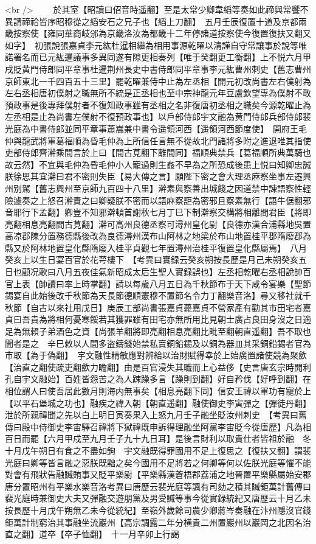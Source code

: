 <br />
　　於其室【昭讀曰佋音時遥翻】至是太常少卿韋縚等奏如此禘與常饗不異請禘祫皆序昭穆從之縚安石之兄子也【縚上刀翻】　五月壬辰復置十道及京都兩畿按察使【雍同華商岐邠為京畿洛汝為都畿十二年停諸道按察使今復置復扶又翻又如字】　初張說張嘉貞李元紘杜暹相繼為相用事源乾曜以清謹自守常讓事於說等唯諾署名而已元紘暹議事多異同遂有隙更相奏列【唯于癸翻更工衡翻】上不悦六月甲戌貶黄門侍郎同平章事杜暹荆州長史中書侍郎同平章事李元紘曹州刺史【舊志曹州京師東北一千四百五十三里】罷乾曜兼侍中止為左丞相【開元初改尚書左右僕射為左右丞相唐初僕射之職無所不統是正丞相也至中宗神龍元年豆盧欽望專為僕射不敢預政事是後專拜僕射者不復知政事雖有丞相之名非復唐初丞相之職矣今源乾曜止為左丞相是止為尚書左僕射不復預政事也】以戶部侍郎宇文融為黄門侍郎兵部侍郎裴光庭為中書侍郎並同平章事蕭嵩兼中書令遥領河西【遥領河西節度使】　開府王毛仲與龍武將軍葛福順為昏毛仲為上所信任言無不從故北門諸將多附之進退唯其指使吏部侍郎齊澣乘間言於上曰【間古莧翻下離間同】福順典禁兵【葛福順所典萬騎也故云然】不宜與毛仲為昏毛仲小人寵過則生姦不早為之所恐成後患上悦曰知卿忠誠朕徐思其宜澣曰君不密則失臣【易大傳之言】願陛下密之會大理丞麻察坐事左遷興州别駕【舊志興州至京師九百四十八里】澣素與察善出城餞之因道禁中諫語察性輕險遽奏之上怒召澣責之曰卿疑朕不密而以語麻察詎為密邪且察素無行【語牛倨翻邪音耶行下孟翻】卿豈不知邪澣頓首謝秋七月丁巳下制澣察交構將相離間君臣【將即亮翻相息亮翻間古莧翻】澣可高州良德丞察可潯州皇化尉【良德亦漢合浦縣地吳置高凉郡陳分置務德縣後改為良德潯州漢布山阿林之地梁於布山地置桂平郡隋廢郡為縣又於阿林地置皇化縣隋廢入桂平貞觀七年置潯州治桂平復置皇化縣屬焉】　八月癸亥上以生日宴百官於花萼樓下　【考異曰實録云癸亥朔按長歷是月己未朔癸亥五日也顧况歌曰八月五夜佳氣新昭成太后生聖人實録誤也】左丞相乾曜右丞相說帥百官上表【帥讀曰率上時掌翻】請以每歲八月五日為千秋節布于天下咸令宴樂【聖節錫宴自此始後改千秋節為天長節德順憲穆不置節名令力丁翻樂音洛】尋又移社就千秋節【自古以來社用戊日】庚辰工部尚書張嘉貞薨嘉貞不營家產有勸其市田宅者嘉貞曰吾貴為將相何憂寒餒若其獲罪雖有田宅亦無所用比見朝士廣占良田身沒之日適足為無賴子弟酒色之資【尚張羊翻將即亮翻相息亮翻比毗至翻朝直遥翻】吾不取也聞者是之　辛巳敕以人間多盗鑄錢始禁私賣銅鉛錫及以銅為器皿其采銅鉛錫者官為市取【為于偽翻】　宇文融性精敏應對辨給以治財賦得幸於上始廣置諸使競為聚歛【治直之翻使疏吏翻歛力瞻翻】由是百官浸失其職而上心益侈【史言唐玄宗時開利孔自宇文融始】百姓皆怨苦之為人踈躁多言【躁則到翻】好自矜伐【好呼到翻】在相位謂人曰使吾居此數月則海内無事矣【相息亮翻下同】信安王禕以軍功有寵於上【以平石堡城之功也】融疾之禕入朝【朝直遥翻】融使御史李寅彈之【彈徒丹翻】泄於所親禕聞之先以白上明日寅奏果入上怒九月壬子融坐貶汝州刺史　【考異曰舊傳曰殿中侍御史李宙驛召禕將下獄禕既申訴得理融坐阿黨李宙貶今從唐歷】凡為相百日而罷【六月甲戍至九月壬子九十九日耳】是後言財利以取貴仕者皆祖於融　冬十月戊午朔日有食之不盡如鉤　宇文融既得罪國用不足上復思之【復扶又翻】謂裴光庭曰卿等皆言融之惡朕既黜之矣今國用不足將若之何卿等何以佐朕光庭等懼不能對會有飛狀告融贓賄事又貶平樂尉【平樂縣漢蒼梧郡荔浦之地晉置平樂縣屬始安郡唐分置昭州有平樂水樂音洛考異曰唐歷云裴光庭等諷有司劾之積其贓鉅萬計舊傳曰裴光庭時兼御史大夫又彈融交遊朋黨及男受贓等事今從實録統紀又唐歷云十月乙未按長歷十月戊午朔無乙未今從統紀】至嶺外歲餘司農少卿蔣岑奏融在汴州隱沒官錢鉅萬計制窮治其事融坐流巖州【高宗調露二年分横貴二州置巖州以巖岡之北因名治直之翻】道卒【卒子恤翻】　十一月辛卯上行謁